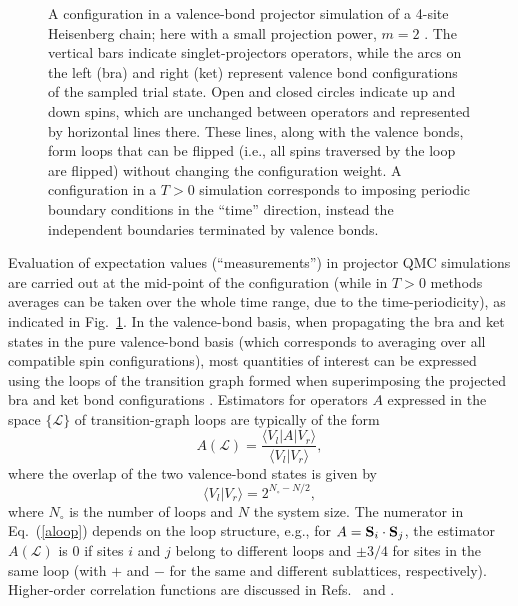 \documentclass[range]{ar2e}
\begin{document}
\begin{figure}
\centerline{}
\caption{A configuration in a valence-bond projector simulation of a 4-site Heisenberg chain; here with a small projection power, 
$m=2$ \cite{Sandvik10a}. The vertical bars indicate singlet-projectors operators, while the arcs on the left (bra) and right (ket) represent 
valence bond configurations of the sampled trial state. Open and closed circles indicate up and down spins, which are unchanged between 
operators and represented by horizontal lines there. These lines, along with the valence bonds, form loops that can be flipped (i.e., 
all spins traversed by the loop are flipped) without changing the configuration weight. A configuration in a $T>0$ simulation corresponds 
to imposing periodic boundary conditions in the ``time'' direction, instead the independent boundaries terminated by valence bonds.}
\label{loops}
\end{figure}

Evaluation of expectation values (``measurements'') in projector QMC simulations are carried out at the mid-point of the configuration (while in $T>0$
methods averages can be taken over the whole time range, due to the time-periodicity), as indicated 
in Fig.~\ref{loops}. In the valence-bond basis, when propagating the bra and ket states in the pure valence-bond basis (which corresponds to averaging 
over all compatible spin configurations), most quantities of interest can be expressed using the loops of the transition graph formed when superimposing 
the projected bra and ket bond configurations \cite{Liang88,Sutherland88}. Estimators for operators $A$ expressed in the space $\{\mathcal{L}\}$ of 
transition-graph loops are typically of the form
\begin{equation}
A(\mathcal{L}) = \frac{\langle V_l|A|V_r\rangle}{\langle V_l|V_r \rangle},
\label{aloop}
\end{equation}
where the overlap of the two valence-bond states is given by
\begin{equation}
\langle V_l|V_r\rangle = 2^{N_\circ - N/2},
\label{vboverlap}
\end{equation}
where $N_\circ$ is the number of loops and $N$ the system size. The numerator in Eq.~(\ref{aloop}) depends on the loop structure, 
e.g., for $A={\bf S}_i \cdot {\bf S}_j$, the estimator $A(\mathcal{L})$ is $0$ if sites $i$ and $j$ belong to different loops and $\pm 3/4$ for 
sites in the same loop (with $+$ and $-$ for the same and different sublattices, respectively). Higher-order correlation functions are discussed 
in Refs.~\cite{Beach06} and \cite{Tang11b}.
\end{document}
